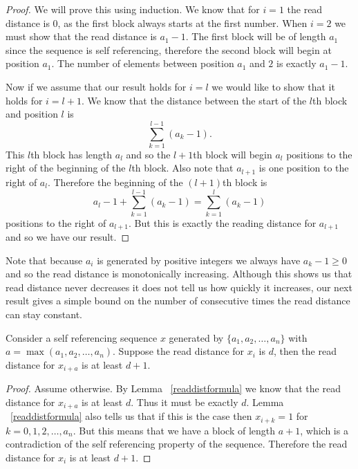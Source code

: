 \documentclass[runningheads,a4paper]{llncs}
\begin{document}
\begin{proof}
We will prove this using induction. We know that for $i=1$ the read distance is $0$, as the first block always starts at the first number. When $i=2$ we must show that the read distance is $a_1-1$. The first block will be of length $a_1$ since the sequence is self referencing, therefore the second block will begin at position $a_1$. The number of elements between position $a_1$ and $2$ is exactly $a_1 -1$. 

Now if we assume that our result holds for $i=l$ we would like to show that it holds for $i=l+1$. We know that the distance between the start of the $l$th block and position $l$ is 
\begin{equation*}
\sum_{k=1}^{l-1}( a_k - 1).
\end{equation*} 
This $l$th block has length $a_l$ and so the $l+1$th block will begin $a_l$ positions to the right of the beginning of the $l$th block. Also note that $a_{l+1}$ is one position to the right of $a_l$. Therefore the beginning of the $(l+1)$th block is 
\begin{equation*}
a_l-1 + \sum_{k=1}^{l-1} (a_k-1) = \sum_{k=1}^{l} (a_k-1)
\end{equation*} 
positions to the right of $a_{l+1}$. But this is exactly the reading distance for $a_{l+1}$ and so we have our result.
\end{proof}
Note that because $a_i$ is generated by positive integers we always have $a_k-1\geq 0$ and so the read distance is monotonically increasing. Although this shows us that read distance never decreases it does not tell us how quickly it increases, our next result gives a simple bound on the number of consecutive times the read distance can stay constant. 

\begin{lemma} Consider a self referencing sequence $x$ generated by $\{a_1, a_2, \ldots, a_n\}$ with $a = \max(a_1, a_2, \ldots, a_n)$. Suppose the read distance for $x_i$ is $d$, then the read distance for $x_{i+a}$ is at least $d+1$. 
\end{lemma}
\begin{proof}
Assume otherwise. By Lemma ~\ref{readdistformula} we know that the read distance for $x_{i+a}$ is at least $d$. Thus it must be exactly $d$. Lemma ~\ref{readdistformula} also tells us that if this is the case then $x_{i+k}=1$ for $k=0,1,2,\ldots, a_n$. But this means that we have a block of length $a+1$, which is a contradiction of the self referencing property of the sequence. Therefore the read distance for $x_{i}$ is at least $d+1$. 
\end{proof}
\end{document}
